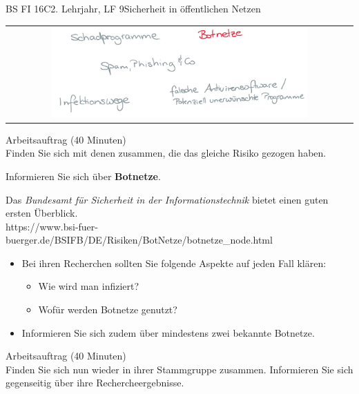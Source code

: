 \documentclass[oneside,openany,headings=optiontotoc,11pt,numbers=noenddot]{scrreprt}
\begin{document}
\begin{worksheet}{BS FI 16C}{2. Lehrjahr, LF 9}{Sicherheit in öffentlichen Netzen}
		\newpage
		\setcounter{page}{1}
		\begin{framed}
			\begin{tabular}{lcr}
				& \includegraphics[width=0.8\textwidth]{Bilder/Botnetze.jpg} & \\
			\end{tabular}
		\end{framed}
		\color{codegray}Arbeitsauftrag (40 Minuten)\\
		\color{black}
		Finden Sie sich mit denen zusammen, die das gleiche Risiko gezogen haben.
		\par
		\bigskip
		\noindent
		Informieren Sie sich über \textbf{Botnetze}.
		\par
		\bigskip
		\noindent
		Das \textit{Bundesamt für Sicherheit in der Informationstechnik} bietet einen guten ersten Überblick.\\
		\small{\color{codegray}https://www.bsi-fuer-buerger.de/BSIFB/DE/Risiken/BotNetze/botnetze\_node.html}
		\normalsize
		\begin{itemize}
			\item[] Bei ihren Recherchen sollten Sie folgende Aspekte auf jeden Fall klären:
			\begin{itemize}
				\item Wie wird man infiziert?
				\item Wofür werden Botnetze genutzt?
			\end{itemize}
			\item[] Informieren Sie sich zudem über mindestens zwei bekannte Botnetze.
		\end{itemize}
		\par
		\bigskip
		\noindent
		
		\color{codegray}Arbeitsauftrag (40 Minuten)\\
		\color{black}
		Finden Sie sich nun wieder in ihrer Stammgruppe zusammen. Informieren Sie sich gegenseitig über ihre Rechercheergebnisse.
	

\end{worksheet}
\end{document}
